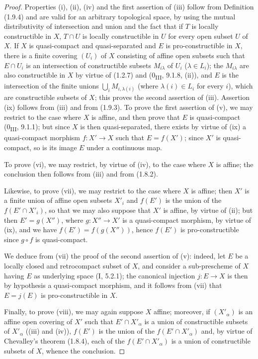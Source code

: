 \begin{proof}
Properties (i), (ii), (iv) and the first assertion of (iii) follow
from Definition (1.9.4) and are valid for an arbitrary topological space,
by using the mutual distributivity of intersection and union and the fact
that if $T$ is locally constructible in $X$, $T\cap U$ is locally
constructible in $U$ for every open subset $U$ of $X$.
If $X$ is quasi-compact and quasi-separated and $E$ is pro-constructible in
$X$, there is a finite covering $(U_i)$ of $X$ consisting of affine open
subsets such that $E\cap U_i$ is an intersection of constructible subsets
$M_{i\lambda}$ of $U_i$ ($\lambda\in L_i$); the $M_{i\lambda}$ are also
constructible in $X$ by virtue of (1.2.7) and (0\textsubscript{III}, 9.1.8,
(ii)), and $E$ is the intersection of the finite unions
$\bigcup_iM_{i,\lambda(i)}$ (where $\lambda(i)\in L_i$ for every $i$), which
are constructible subsets of $X$; this proves the second assertion of (iii).
Assertion (ix) follows from (iii) and from (1.9.3). To prove the first
assertion of (v), we may restrict to the case where $X$ is affine, and then
prove that $E$ is quasi-compact (0\textsubscript{III}, 9.1.1); but since $X$
is then quasi-separated, there exists by virtue of (ix) a quasi-compact
morphism $f:X'\to X$ such that $E=f(X')$; since $X'$ is quasi-compact, so is
its image $E$ under a continuous map.

To prove (vi), we may restrict, by virtue of (iv), to the case where $X$ is
affine; the conclusion then follows from (iii) and from (1.8.2).


Likewise, to prove (vii), we may restrict to the case where $X$ is affine;
then $X'$ is a finite union of affine open subsets $X'_i$ and $f(E')$ is the
union of the $f(E'\cap X'_i)$, so that we may also suppose that $X'$ is
affine, by virtue of (ii); but then $E'=g(X'')$, where $g:X''\to X'$ is a
quasi-compact morphism, by virtue of (ix), and we have $f(E')=f(g(X''))$,
hence $f(E')$ is pro-constructible since $g\circ f$ is quasi-compact.

We deduce from (vii) the proof of the second assertion of (v): indeed,
let $E$ be a locally closed and retrocompact subset of $X$, and consider a
sub-prescheme of $X$ having $E$ as underlying space (I,
5.2.1); the canonical injection $j:E\to X$ is then by hypothesis a
quasi-compact morphism, and it follows from (vii) that $E=j(E)$ is
pro-constructible in $X$.

Finally, to prove (viii), we may again suppose $X$ affine; moreover, if
$(X'_\alpha)$ is an affine open covering of $X'$ such that
$E'\cap X'_\alpha$ is a union of constructible subsets of $X'_\alpha$
((iii) and (iv)), $f(E')$ is the union of the $f(E'\cap X'_\alpha)$ and, by
virtue of Chevalley's theorem (1.8.4), each of the $f(E'\cap X'_\alpha)$ is
a union of constructible subsets of $X$, whence the conclusion.
\end{proof}

